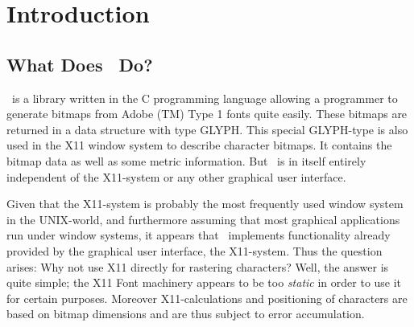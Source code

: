 
\newpage
\section{Introduction}
\subsection{What Does \tonelib\ Do?}
\tonelib\ is a library written in the C programming language 
allowing a programmer to generate bitmaps from Adobe (TM) Type 1 fonts
quite easily. These bitmaps are returned in a data structure
with type {\ttfamily GLYPH}. This special
{\ttfamily GLYPH}-type is also used in the X11 window system to
describe character bitmaps. It contains the bitmap data as well as
some metric information. But \tonelib\ is in itself entirely independent
of the X11-system or any other graphical user interface.

Given that the X11-system is probably the most frequently used
window system in the UNIX-world, and furthermore assuming that most
graphical applications run under window systems, it appears that
\tonelib\ implements functionality already provided by the
graphical user interface,
the X11-system. Thus the question arises: Why not use X11 directly for
rastering characters? Well, the answer is quite simple; the X11 Font
machinery appears to be too {\em static} in order to use it for
certain purposes. Moreover X11-calculations and positioning of
characters are based on bitmap
dimensions and are thus subject to error accumulation.

